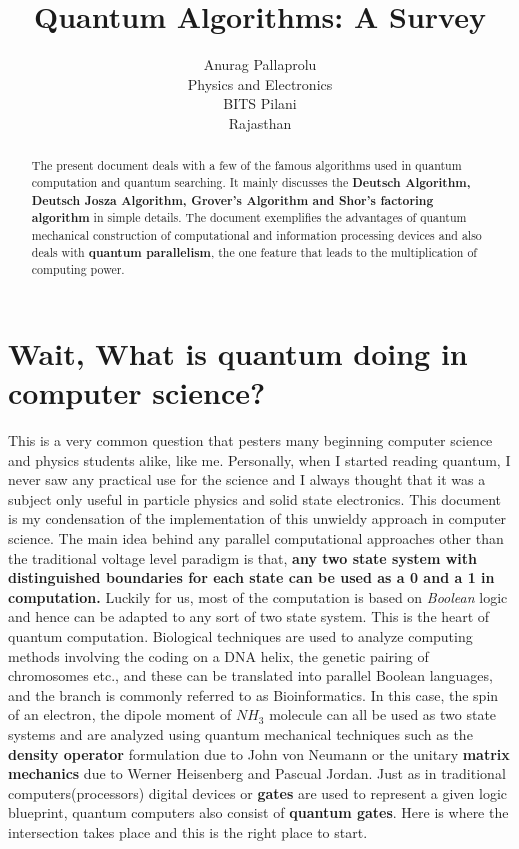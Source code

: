 \documentclass[12pt]{article}
\begin{document}
\title{Quantum Algorithms: A Survey}
\author{Anurag Pallaprolu \\ Physics and Electronics \\ BITS Pilani \\ Rajasthan}
\maketitle
\begin{abstract}
The present document deals with a few of the famous algorithms used in quantum computation and quantum searching. It mainly discusses the \textbf{Deutsch Algorithm, Deutsch Josza Algorithm, Grover's Algorithm and Shor's factoring algorithm} in simple details. The document exemplifies the advantages of quantum mechanical construction of computational and information processing devices and also deals with \textbf{quantum parallelism}, the one feature that leads to the multiplication of computing power.
\end{abstract}

\section{Wait, What is quantum doing in computer science?}
This is a very common question that pesters many  beginning computer science and physics students alike, like me. Personally, when I started reading quantum, I never saw any practical use for the science and I always thought that it was a subject only useful in particle physics and solid state electronics. This document is my condensation of the implementation of this unwieldy approach in computer science. The main idea behind any parallel computational approaches other than the traditional voltage level paradigm is that, \textbf{any two state system with distinguished boundaries for each state can be used as a 0 and a 1 in computation.} Luckily for us, most of the computation is based on \textit{Boolean} logic and hence can be adapted to any sort of two state system. This is the heart of quantum computation. Biological techniques are used to analyze computing methods involving the coding on a DNA helix, the genetic pairing of chromosomes etc., and these can be translated into parallel Boolean languages, and the branch is commonly referred to as Bioinformatics. In this case, the spin of an electron, the dipole moment of $NH_3$ molecule can all be used as two state systems and are analyzed using quantum mechanical techniques such as the \textbf{density operator} formulation due to John von Neumann or the unitary \textbf{matrix mechanics} due to Werner Heisenberg and Pascual Jordan. Just as in traditional computers(processors) digital devices or \textbf{gates} are used to represent a given logic blueprint, quantum computers also consist of \textbf{quantum gates}. Here is where the intersection takes place and this is the right place to start.
\end{document}
